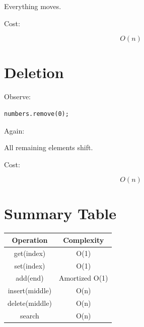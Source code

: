 \documentclass[11pt,a4paper]{book}
\begin{document}

Everything moves.


Cost:

\[
O(n)
\]


\section{Deletion}

Observe:

\begin{verbatim} 
numbers.remove(0);
\end{verbatim}


Again:


All remaining elements shift.


Cost:

\[
O(n)
\]


\section{Summary Table}

\begin{center}

\begin{tabular}{|c|c|}
\hline
Operation & Complexity \\
\hline

get(index)
&
O(1)
\\
\hline

set(index)
&
O(1)
\\
\hline

add(end)
&
Amortized O(1)
\\
\hline

insert(middle)
&
O(n)
\\
\hline

delete(middle)
&
O(n)
\\
\hline

search
&
O(n)
\\
\hline

\end{tabular}

\end{center}
\end{document}
